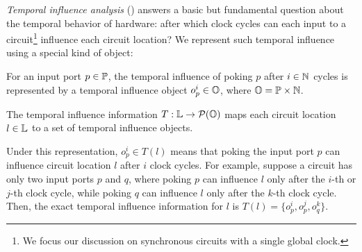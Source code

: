 \emph{Temporal influence analysis} (\tia) answers a basic but fundamental question about the temporal behavior of hardware: after which clock cycles can each input to a circuit\footnote{We focus our discussion on synchronous circuits with a single global clock.} influence each circuit location?
We represent such temporal influence using a special kind of object:
\begin{definition}
    For an input port $p \in \mathbb{P}$, the temporal influence of poking $p$ after $i \in \mathbb{N}$ cycles is represented by a temporal influence object $o_p^i \in \mathbb{O}$, where $\mathbb{O} = \mathbb{P} \times \mathbb{N}$.
\end{definition}
\begin{definition}
    The temporal influence information $T : \mathbb{L} \to \mathcal{P}(\mathbb{O})$ maps each circuit location $l \in \mathbb{L}$ to a set of temporal influence objects.
\end{definition}
\noindent
Under this representation, $o_p^i \in T(l)$ means that poking the input port $p$ can influence circuit location $l$ after $i$ clock cycles.
For example, suppose a circuit has only two input ports $p$ and $q$, where poking $p$ can influence $l$ only after the $i$-th or $j$-th clock cycle, while poking $q$ can influence $l$ only after the $k$-th clock cycle.
Then, the exact temporal influence information for $l$ is $T(l) = \{o_p^i, o_p^j, o_q^k\}$.


